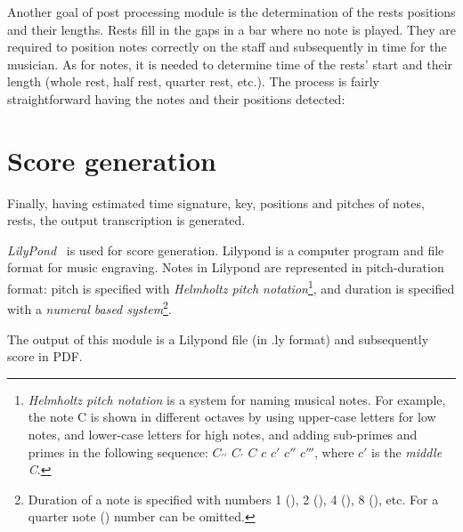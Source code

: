 Another goal of post processing module is the determination of the rests positions and their lengths. Rests fill in
the gaps in a bar where no note is played. They are required to position notes correctly on the staff and subsequently
in time for the musician.
As for notes, it is needed to determine time of the rests' start and their length (whole rest, half rest, quarter rest,
etc.). The process is fairly straightforward having the notes and their positions detected:


\section{Score generation}\label{sec:score-generation}

Finally, having estimated time signature, key, positions and pitches of notes, rests, the output transcription is
generated.

\textit{LilyPond}~\cite{lilypond} is used for score generation. Lilypond is a computer program and file format for music
engraving. Notes in Lilypond are represented in pitch-duration format: pitch is specified with \textit{Helmholtz pitch
notation}\footnote{\textit{Helmholtz pitch notation} is a system for naming musical notes. For example, the note C is
shown in different octaves by using upper-case letters for low notes, and lower-case letters for high notes, and adding
sub-primes and primes in the following sequence: $C_{\prime\prime}$ $C_\prime$ $C$ $c$ $c'$ $c''$ $c'''$, where $c'$ is
the \textit{middle C}.}, and duration is specified with a \textit{numeral based system}\footnote{Duration of a note is
specified with numbers 1 (\Ganz), 2 (\Halb), 4 (\Vier), 8 (\Acht), etc. For a quarter note (\Vier) number can be
omitted.}.

The output of this module is a Lilypond file (in .ly format) and subsequently score in \ac{PDF}.